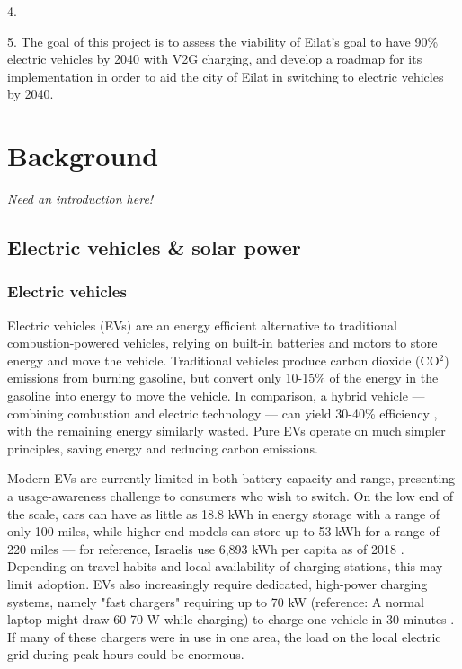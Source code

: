 \documentclass{report}                         %
\begin{document}
4.

5. The goal of this project is to assess the viability of Eilat's goal to have 90\% electric vehicles by 2040 with V2G charging, and develop a roadmap for its implementation in order to aid the city of Eilat in switching to electric vehicles by 2040.


\newpage
\chapter{Background}
\textit{Need an introduction here!}

\section{Electric vehicles \& solar power}
\subsection{Electric vehicles}
Electric vehicles (EVs) are an energy efficient alternative to traditional combustion-powered vehicles, relying on built-in batteries and motors to store energy and move the vehicle. Traditional vehicles produce carbon dioxide (CO$^2$) emissions from burning gasoline, but convert only 10-15\% of the energy in the gasoline into energy to move the vehicle. In comparison, a hybrid vehicle --- combining combustion and electric technology --- can yield 30-40\% efficiency \cite{Zhu2015DistributedGrid}, with the remaining energy similarly wasted. Pure EVs operate on much simpler principles, saving energy and reducing carbon emissions.

Modern EVs are currently limited in both battery capacity and range, presenting a usage-awareness challenge to consumers who wish to switch. On the low end of the scale, cars can have as little as 18.8 kWh in energy storage with a range of only 100 miles, while higher end models can store up to 53 kWh for a range of 220 miles \cite{Ustun2015ImpactSystems} --- for reference, Israelis use 6,893 kWh per capita as of 2018 \cite{2018Key2018}. Depending on travel habits and local availability of charging stations, this may limit adoption. EVs also increasingly require dedicated, high-power charging systems, namely "fast chargers" requiring up to 70 kW (reference: A normal laptop might draw 60-70 W while charging) to charge one vehicle in 30 minutes \cite{Ustun2015ImpactSystems}. If many of these chargers were in use in one area, the load on the local electric grid during peak hours could be enormous.
\end{document}
